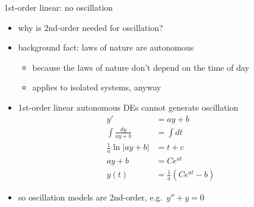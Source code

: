 \documentclass[urlcolor=blue]{beamer}
\begin{document}
\begin{frame}{1st-order linear: no oscillation}

\begin{itemize}
\item why is 2nd-order needed for oscillation?
\item background fact: laws of nature are autonomous
    \begin{itemize}
    \item because the laws of nature don't depend on the time of day
    \item applies to isolated systems, anyway
    \end{itemize}
\item 1st-order linear autonomous DEs cannot generate oscillation \small
\begin{align*}
y' &= a y + b \\
\int \frac{dy}{ay+b} &= \int dt \\
\frac{1}{a} \ln|ay+b| &= t+c \\
a y + b &= C e^{at} \\
y(t) &= \frac{1}{a}\left(C e^{at} - b\right)
\end{align*}
\item so oscillation models are 2nd-order, e.g.~$y'' + y = 0$
\end{itemize}
\end{frame}
\end{document}
